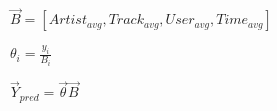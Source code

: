 \documentclass{article}
\begin{document}
 $ \vec{B} = [Artist_{avg}, Track_{avg}, User_{avg}, Time_{avg}]$

\hfill

$\theta_{i} = \frac{y_{i}}{B_{i}}$

\hfill


$\vec{Y}_{pred} = \vec{\theta}\vec{B} $    

\hfill


 
\end{document}
